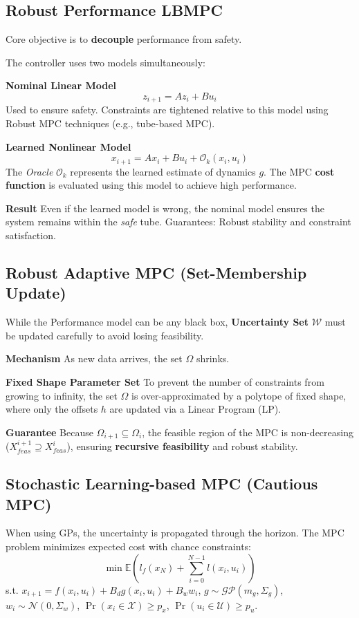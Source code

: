 \subsection{Robust Performance LBMPC}

Core objective is to \textbf{decouple} performance from safety.

The controller uses two models simultaneously:

\textbf{Nominal Linear Model}
\[
  z_{i+1} = Az_i + Bu_i
\]
Used to ensure safety.
Constraints are tightened relative to this model using
Robust MPC techniques (e.g., tube-based MPC).

\textbf{Learned Nonlinear Model}
\[
  x_{i+1} = Ax_i + Bu_i + \mathcal{O}_k(x_i, u_i)
\]
The \textit{Oracle} $\mathcal{O}_k$ represents the learned estimate
of dynamics $g$.
The MPC \textbf{cost function} is evaluated using
this model to achieve high performance.

\textbf{Result}
Even if the learned model is wrong,
the nominal model ensures the system remains within the \textit{safe} tube.
Guarantees: Robust stability and constraint satisfaction.

\subsection{Robust Adaptive MPC (Set-Membership Update)}

While the Performance model can be any black box,
\textbf{Uncertainty Set} $\mathcal{W}$ must be updated carefully
to avoid losing feasibility.

\textbf{Mechanism} As new data arrives, the set $\Omega$ shrinks.

\textbf{Fixed Shape Parameter Set}
To prevent the number of constraints from growing to infinity,
the set $\Omega$ is over-approximated by a polytope of fixed shape,
where only the offsets $h$ are updated via a Linear Program (LP).

\textbf{Guarantee}
Because $\Omega_{i+1} \subseteq \Omega_i$,
the feasible region of the MPC is non-decreasing
($X_{feas}^{i+1} \supseteq X_{feas}^i$),
ensuring \textbf{recursive feasibility} and robust stability.

\subsection{Stochastic Learning-based MPC (Cautious MPC)}

When using GPs, the uncertainty is propagated through the horizon.
The MPC problem minimizes expected cost with chance constraints:
\[
  \min \mathbb{E} \left( l_f(x_N) + \sum_{i=0}^{N-1} l(x_i, u_i) \right)
\]
s.t. \(x_{i+1} = f(x_i, u_i) + B_d g(x_i, u_i) + B_w w_i\), \(g \sim
\mathcal{GP}(m_g, \Sigma_g)\), \(w_i \sim \mathcal{N}(0, \Sigma_w)\),
\(\Pr(x_i \in \mathcal{X}) \geq p_x\), \(\Pr(u_i \in \mathcal{U}) \geq p_u\).

